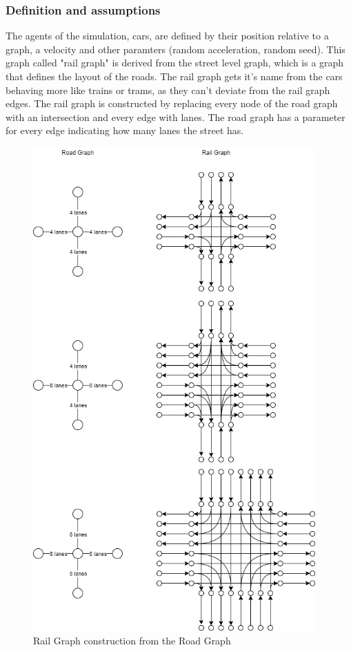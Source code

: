 \documentclass[12pt]{article}
\begin{document}
\subsubsection{Definition and assumptions}
The agents of the simulation, cars, are defined by their position relative to a graph, a velocity and other paramters (random acceleration, random seed). This graph called "rail graph" is derived from the street level graph, which is a graph that defines the layout of the roads. The rail graph gets it's name from the cars behaving more like trains or trams, as they can't deviate from the rail graph edges. The rail graph is constructed by replacing every node of the road graph with an intersection and every edge with lanes. The road graph has a parameter for every edge indicating how many lanes the street has.
\begin{figure}[H]
\begin{center}
\includegraphics[height=18.5cm]{railgraph}
\caption{Rail Graph construction from the Road Graph}
\end{center}
\end{figure}
\end{document}
